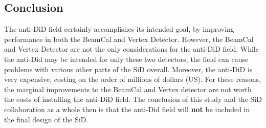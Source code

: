 \documentclass{report}
\begin{document}
            \subsection{Conclusion}
                The anti-DiD field certainly accomplishes its intended goal, by improving performance in both the BeamCal and Vertex Detector. However, the BeamCal and Vertex Detector are not the only considerations for the anti-DiD field. While the anti-Did may be intended for only these two detectors, the field can cause problems with various other parts of the SiD overall. Moreover, the anti-DiD is very expensive, costing on the order of millions of dollars (US). For these reasons, the marginal improvements to the BeamCal and Vertex detector are not worth the costs of installing the anti-DiD field. The conclusion of this study and the SiD collaboration as a whole then is that the anti-Did field will \textbf{not} be included in the final design of the SiD.





        
    
\end{document}
